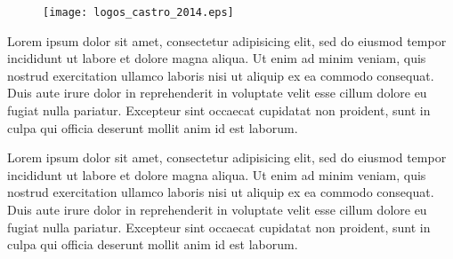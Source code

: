 \documentclass[a4paper,10pt,twoside]{article}
\begin{document}
\begin{figure}[htbp!]
 \texttt{[image: logos\_castro\_2014.eps]}
\end{figure}

Lorem ipsum dolor sit amet, consectetur adipisicing elit, sed do eiusmod tempor incididunt ut labore 
et dolore magna aliqua. Ut enim ad minim veniam, quis nostrud exercitation ullamco laboris nisi ut 
aliquip ex ea commodo consequat. Duis aute irure dolor in reprehenderit in voluptate velit esse cillum 
dolore eu fugiat nulla pariatur. Excepteur sint occaecat cupidatat non proident, sunt in culpa qui 
officia deserunt mollit anim id est laborum.

Lorem ipsum dolor sit amet, consectetur adipisicing elit, sed do eiusmod tempor incididunt ut labore 
et dolore magna aliqua. Ut enim ad minim veniam, quis nostrud exercitation ullamco laboris nisi ut 
aliquip ex ea commodo consequat. Duis aute irure dolor in reprehenderit in voluptate velit esse cillum 
dolore eu fugiat nulla pariatur. Excepteur sint occaecat cupidatat non proident, sunt in culpa qui 
officia deserunt mollit anim id est laborum.
\end{document}
